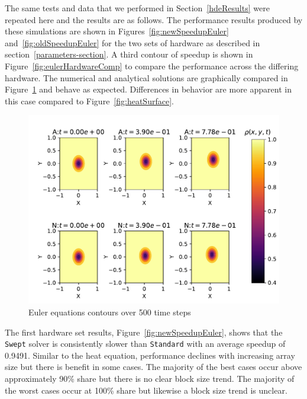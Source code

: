 \documentclass[review]{elsarticle}
\def\Swept{\texttt{Swept}}
\def\Standard{\texttt{Standard}}
\begin{document}
The same tests and data that we performed in Section~\ref{hdeResults} were repeated here and the results are as follows. The performance results produced by these simulations are shown in Figures~\ref{fig:newSpeedupEuler} and~\ref{fig:oldSpeedupEuler} for the two sets of hardware as described in section~\ref{parameters-section}. A third contour of speedup is shown in Figure~\ref{fig:eulerHardwareComp} to compare the performance across  the differing hardware. The numerical and analytical solutions are graphically compared in Figure~\ref{fig:eulerSurface} and behave as expected. Differences in behavior are more apparent in this case compared to Figure~\ref{fig:heatSurface}. 

\begin{figure}[htb!]
    \centering
    \includegraphics{figs/eulerValidate.pdf}
    \caption{Euler equations contours over 500 time steps}
    \label{fig:eulerSurface}
\end{figure}

The first hardware set results, Figure~\ref{fig:newSpeedupEuler}, shows that the \Swept{} solver is consistently slower than \Standard{} with an average speedup of 0.9491. Similar to the heat equation, performance declines with increasing array size but there is benefit in some cases. The majority of the best cases occur above approximately 90\% share but there is no clear block size trend. The majority of the worst cases occur at 100\% share but likewise a block size trend is unclear.
\end{document}
